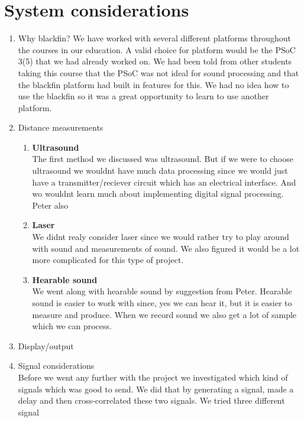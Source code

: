 \chapter{System considerations}
\begin{enumerate}
\item Why blackfin?
We have worked with several different platforms throughout the courses in our education. A valid choice for platform would be the PSoC 3(5) that we had already worked on. We had been told from other students taking this course that the PSoC was not ideal for sound processing and that the blackfin platform had built in features for this. We had no idea how to use the blackfin so it was a great opportunity to learn to use another platform. 
\item Distance measurements
\begin{enumerate}

\item \textbf{Ultrasound}\\
The first method we discussed was ultrasound. But if we were to choose ultrasound we wouldnt have much data processing since we would just have a transmitter/reciever circuit which has an electrical interface. And wo wouldnt learn much about implementing digital signal processing. Peter also 

\item \textbf{Laser}\\
We didnt realy consider laser since we would rather try to play around with sound and measurements of sound. We also figured it would be a lot more complicated for this type of project.

\item \textbf{Hearable sound}\\
We went along with hearable sound by suggestion from Peter. Hearable sound is easier to work with since, yes we can hear it, but it is easier to measure and produce. When we record sound we also get a lot of sample which we can process.
\end{enumerate}

\item Display/output
\item Signal considerations\\
Before we went any further with the project we investigated which kind of signals which was good to send. We did that by generating a signal, made a delay and then cross-correlated these two signals.
We tried three different signal
\end{enumerate}
